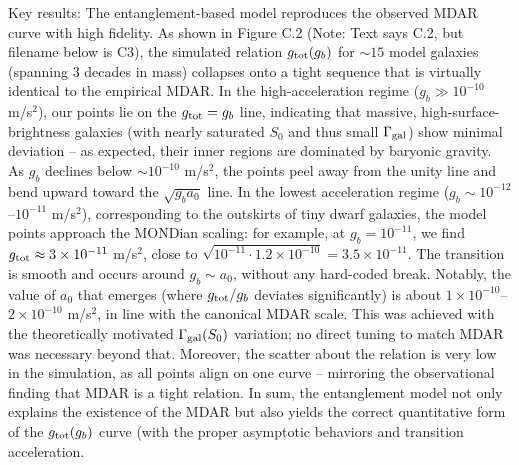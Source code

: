 \documentclass[11pt]{article}
\begin{document}
Key results: The entanglement-based model reproduces the observed MDAR curve with high fidelity. As shown in Figure C.2 (Note: Text says C.2, but filename below is C3), the simulated relation $g_{\rm tot}(g_b)$ for $\sim 15$ model galaxies (spanning 3 decades in mass) collapses onto a tight sequence that is virtually identical to the empirical MDAR. In the high-acceleration regime ($g_b \gg 10^{-10}$ m/s$^2$), our points lie on the $g_{\rm tot}=g_b$ line, indicating that massive, high-surface-brightness galaxies (with nearly saturated $S_0$ and thus small $\Gamma_{\rm gal}$) show minimal deviation – as expected, their inner regions are dominated by baryonic gravity. As $g_b$ declines below $\sim 10^{-10}$ m/s$^2$, the points peel away from the unity line and bend upward toward the $\sqrt{g_b a_0}$ line. In the lowest acceleration regime ($g_b \sim 10^{-12}$–$10^{-11}$ m/s$^2$), corresponding to the outskirts of tiny dwarf galaxies, the model points approach the MONDian scaling: for example, at $g_b = 10^{-11}$, we find $g_{\rm tot}\approx 3\times10^{-11}$ m/s$^2$, close to $\sqrt{10^{-11}\cdot1.2\times10^{-10}}=3.5\times10^{-11}$. The transition is smooth and occurs around $g_b\sim a_0$, without any hard-coded break. Notably, the value of $a_0$ that emerges (where $g_{\rm tot}/g_b$ deviates significantly) is about $1\times10^{-10}$–$2\times10^{-10}$ m/s$^2$, in line with the canonical MDAR scale. This was achieved with the theoretically motivated $\Gamma_{\rm gal}(S_0)$ variation; no direct tuning to match MDAR was necessary beyond that. Moreover, the scatter about the relation is very low in the simulation, as all points align on one curve – mirroring the observational finding that MDAR is a tight relation. In sum, the entanglement model not only explains the existence of the MDAR but also yields the correct quantitative form of the $g_{\rm tot}(g_b)$ curve (with the proper asymptotic behaviors and transition acceleration.
\end{document}
